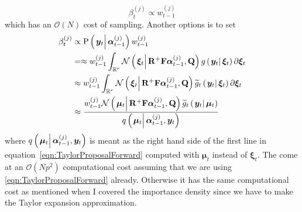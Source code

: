 \documentclass[9pt, notitlepage]{article}
\renewcommand{\vec}[1]{\bm{#1}}
\newcommand{\mat}[1]{\mathbf{#1}}
\newcommand{\Lparen}[1]{\left( #1\right)}
\newcommand{\Cond}[2]{\left. #1 \vphantom{#2} \right\vert  #2}
\newcommand{\Prob}{\text{P}}
\newcommand{\optor}[2]{#1\Lparen{#2}}
\newcommand{\optorC}[3]{\optor{#1}{\Cond{#2}{#3}}}
\newcommand{\propC}[2]{\optorC{\Prob}{#1}{#2}}
\newcommand{\normalC}[3]{\optorC{\mathcal{N}}{#1}{#2,#3}}
\newcommand{\IDC}[2]{\optorC{q}{#1}{#2}}
\newcommand{\partic}[3]{#1_{#2}^{\Lparen{#3}}}
\newcommand{\bigO}[1]{\mathcal{O}\Lparen{#1}}
\newcommand{\dimState}{p}
\newcommand{\dimRng}{r}
\newcommand{\nPart}{N}
\begin{document}
\begin{equation}
	\partic{\beta}{t}{j} \propto \partic{w}{t-1}{j}
\end{equation}
%
which has an $\bigO{\nPart}$ cost of sampling. Another options is to set%
%
\begin{equation}\label{eqn:FWWeights}
\begin{split}
	\partic{\beta}{t}{j} &\propto  \propC{\vec{y}_t}{\partic{\vec{\alpha}}{t-1}{j}}\partic{w}{t-1}{j} \\
%
	& = \approx \partic{w}{t-1}{j} \int_{\mathbb{R}^\dimRng}
		\normalC{\vec{\xi}_t}{\mat{R}^{+}\mat{F}\partic{\vec{\alpha}}{t-1}{j}}{\mat{Q}}
		\optorC{g}{\vec{y}_t}{\vec{\xi}_t}
		\partial \vec{\xi}_t \\
%
	& \approx \partic{w}{t-1}{j} \int_{\mathbb{R}^\dimRng}
		\normalC{\vec{\xi}_t}{\mat{R}^{+}\mat{F}\partic{\vec{\alpha}}{t-1}{j}}{\mat{Q}}
		\optorC{\widetilde{g}_t}{\vec{y}_t}{\vec{\xi}_t}
		\partial \vec{\xi}_t \\
%
	& \approx \frac{
		\partic{w}{t-1}{j}
		\normalC{\vec{\mu}_t}{\mat{R}^{+}\mat{F}\partic{\vec{\alpha}}{t-1}{j}}{\mat{Q}}
		\optorC{\widetilde{g}_t}{\vec{y}_t}{\vec{\mu}_t}
	}{ %
		\IDC{\vec{\mu}_t}{\partic{\vec{\alpha}}{t-1}{j}, \vec{y}_t}
	}
\end{split}
\end{equation}%
%
where $\IDC{\vec{\mu}_t}{\partic{\vec{\alpha}}{t-1}{j}, \vec{y}_t}$ is meant as the right hand side of the first line in equation~\eqref{eqn:TaylorProposalForward} computed with $\vec{\mu}_t$ instead of $\vec{\xi}_t$. The come at an $\bigO{\nPart\dimState^2}$ computational cost assuming that we are using \eqref{eqn:TaylorProposalForward} already. Otherwise it has the same computational cost as mentioned when I covered the importance density since we have to make the Taylor expansion approximation.
\end{document}
